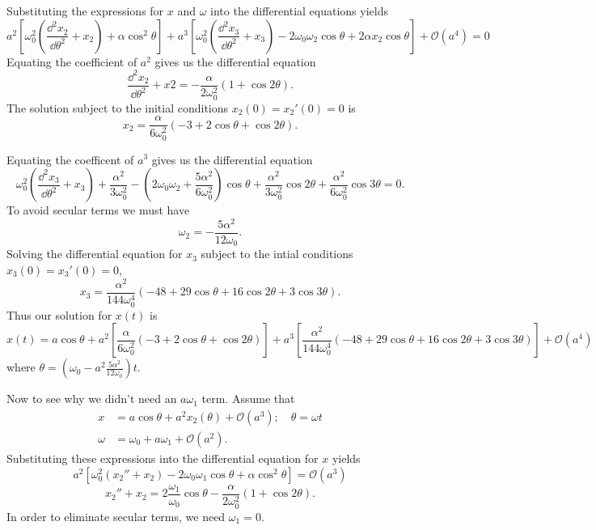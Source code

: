 \begin{Solution}
  Substituting the expressions for $x$ and $\omega$ into the differential 
  equations yields
  \[ a^2\left[\omega_0^2\left(\frac{\dd^2 x_2}{\dd \theta^2}+x_2\right) 
    + \alpha \cos^2\theta \right] 
  + a^3\left[\omega_0^2\left(\frac{\dd^2 x_3}{\dd \theta^2} + x_3\right) 
    -2\omega_0 \omega_2 \cos\theta + 2\alpha x_2 \cos\theta\right]
  + \mathcal{O}(a^4) = 0 \]
  Equating the coefficient of $a^2$ gives us the differential equation
  \[ \frac{\dd^2 x_2}{\dd \theta^2} + x2 = -\frac{\alpha}{2\omega_0^2}(1+\cos 2\theta). \]
  The solution subject to the initial conditions $x_2(0)=x_2'(0)=0$ is
  \[ x_2 = \frac{\alpha}{6\omega_0^2}(-3+2\cos\theta+\cos 2\theta). \]

  Equating the coefficent of $a^3$ gives us the differential equation
  \[ \omega_0^2\left(\frac{\dd^2 x_3}{\dd \theta^2} + x_3 \right) 
  + \frac{\alpha^2}{3\omega_0^2}
  -\left(2\omega_0\omega_2+\frac{5\alpha^2}{6\omega_0^2}\right)\cos\theta
  +\frac{\alpha^2}{3\omega_0^2}\cos 2\theta
  +\frac{\alpha^2}{6\omega_0^2}\cos 3\theta = 0. \]
  To avoid secular terms we must have
  \[ \omega_2 = -\frac{5\alpha^2}{12\omega_0}. \]
  Solving the differential equation for $x_3$ subject to the intial conditions
  $x_3(0) = x_3'(0) = 0$,
  \[ x_3 = \frac{\alpha^2}{144\omega_0^4}(-48+29\cos\theta+16\cos 2\theta
  + 3\cos 3\theta). \]
  Thus our solution for $x(t)$ is
  \[ \boxed{ x(t) = a \cos\theta 
    +a^2\left[\frac{\alpha}{6\omega_0^2}
      (-3+2\cos\theta+\cos 2\theta)\right]
    + a^3\left[\frac{\alpha^2}{144\omega_0^4}
      (-48+29\cos\theta+16\cos 2\theta + 3\cos 3\theta)\right]
    +\mathcal{O}(a^4) } \]
  where $\theta = \left(\omega_0 - a^2 \frac{5\alpha^2}{12\omega_0} \right)t$.


  Now to see why we didn't need an $a\omega_1$ term.
  Assume that
  \begin{align*}
    x &= a\cos\theta + a^2 x_2(\theta) + \mathcal{O}(a^3);\quad \theta=\omega t \\
    \omega &= \omega_0 + a \omega_1 + \mathcal{O}(a^2).
  \end{align*}
  Substituting these expressions into the differential equation for $x$ yields
  \[ a^2 \left[ \omega_0^2(x_2''+x_2) - 2\omega_0 \omega_1 \cos\theta
    +\alpha\cos^2\theta \right] = \mathcal{O}(a^3) \]
  \[ x_2'' + x_2 = 2\frac{\omega_1}{\omega_0}\cos\theta 
  - \frac{\alpha}{2 \omega_0^2} (1+\cos 2\theta). \]
  In order to eliminate secular terms, we need $\omega_1=0$.
\end{Solution}





